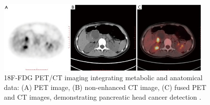 \begin{figure}[H]
	\centering
	\includegraphics[width=0.95\textwidth]{assets/tcr-10-07-3560-f1.jpg}
	\caption{18F-FDG PET/CT imaging integrating metabolic and anatomical data: (A) PET image, (B) non-enhanced CT image, (C) fused PET and CT images, demonstrating pancreatic head cancer detection \cite{Pu2021}.}
	\label{fig:PuFig1}
\end{figure}



